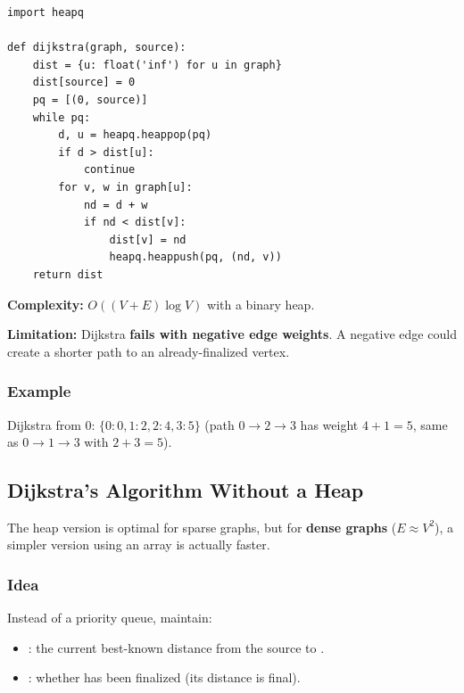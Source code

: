 \documentclass[11pt,a4paper]{article}
\newcommand{\code}[1]{\texttt{\detokenize{#1}}}
\begin{document}
\begin{lstlisting}
import heapq

def dijkstra(graph, source):
    dist = {u: float('inf') for u in graph}
    dist[source] = 0
    pq = [(0, source)]
    while pq:
        d, u = heapq.heappop(pq)
        if d > dist[u]:
            continue
        for v, w in graph[u]:
            nd = d + w
            if nd < dist[v]:
                dist[v] = nd
                heapq.heappush(pq, (nd, v))
    return dist
\end{lstlisting}

\textbf{Complexity:} $O((V + E) \log V)$ with a binary heap.

\textbf{Limitation:} Dijkstra \textbf{fails with negative edge weights}. A negative edge could create a shorter path to an already-finalized vertex.

\subsubsection{Example}

\begin{center}
\end{center}

Dijkstra from 0: $\{0: 0, 1: 2, 2: 4, 3: 5\}$ (path $0 \to 2 \to 3$ has weight $4 + 1 = 5$, same as $0 \to 1 \to 3$ with $2 + 3 = 5$).

\subsection{Dijkstra's Algorithm Without a Heap}

The heap version is optimal for sparse graphs, but for \textbf{dense graphs} ($E \approx V^2$), a simpler version using an array is actually faster.

\subsubsection{Idea}

Instead of a priority queue, maintain:
\begin{itemize}
    \item \code{dist[v]}: the current best-known distance from the source to \code{v}.
    \item \code{visited[v]}: whether \code{v} has been finalized (its distance is final).
\end{itemize}
\end{document}
